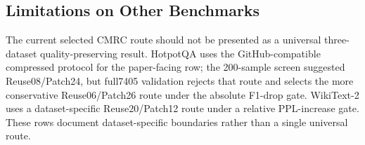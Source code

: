\documentclass{article}
\theoremstyle{plain}
\theoremstyle{definition}
\theoremstyle{remark}
\begin{document}
\begin{table}[t]
  \centering
  \scriptsize
  \caption{\textbf{Patch-only and Reuse-only anchors.}
  QA rows report F1/EM; WikiText-2 reports perplexity.  Patch-only recovers
  quality on all three benchmark protocols, while Reuse-only is the fast but
  low-quality lower anchor.}
  \label{tab:patchonly_anchors}
  \setlength{\tabcolsep}{3pt}
\end{table}

\subsection{Limitations on Other Benchmarks}
\label{subsec:current_limitations}

The current selected CMRC route should not be presented as a universal
three-dataset quality-preserving result.  HotpotQA uses the GitHub-compatible
compressed protocol for the paper-facing row; the 200-sample screen suggested
Reuse08/Patch24, but full7405 validation rejects that route and selects the
more conservative Reuse06/Patch26 route under the absolute F1-drop gate.
WikiText-2 uses a dataset-specific Reuse20/Patch12 route under a relative
PPL-increase gate.  These rows document dataset-specific boundaries rather than
a single universal route.
\end{document}
